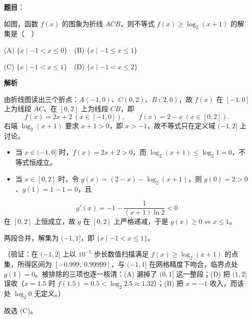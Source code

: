 \begin{answer}

\textbf{题目}：

如图，函数 \(f(x)\) 的图象为折线 \(ACB\)，则不等式 \(f(x)\geqslant\log_{2}(x+1)\) 的解集是（　）
\nopagebreak[4]
\begin{center}\end{center}
\nopagebreak[4]
(A) \(\{x\mid -1<x\leqslant 0\}\)　(B) \(\{x\mid -1\leqslant x\leqslant 1\}\)

(C) \(\{x\mid -1<x\leqslant 1\}\)　(D) \(\{x\mid -1<x\leqslant 2\}\)

\textbf{解析}

由折线图读出三个折点：\(A(-1,0)\)、\(C(0,2)\)、\(B(2,0)\)，故 \(f(x)\) 在 \([-1,0]\) 上为线段 \(AC\)、在 \([0,2]\) 上为线段 \(CB\)，即
\nopagebreak[4]
\[
f(x)=2x+2\ (x\in[-1,0]),\qquad f(x)=2-x\ (x\in[0,2]).
\]
右端 \(\log_{2}(x+1)\) 要求 \(x+1>0\)，即 \(x>-1\)，故不等式只在定义域 \((-1,2]\) 上讨论。

\begin{itemize}
\item 当 \(x\in(-1,0]\) 时，\(f(x)=2x+2>0\)，而 \(\log_{2}(x+1)\leqslant\log_{2}1=0\)，不等式恒成立。
\item 当 \(x\in[0,2]\) 时，令 \(g(x)=(2-x)-\log_{2}(x+1)\)，则 \(g(0)=2>0\)、\(g(1)=1-1=0\)，且
\end{itemize}
\nopagebreak[4]
\[
g'(x)=-1-\frac{1}{(x+1)\ln 2}<0
\]
在 \([0,2]\) 上恒成立，故 \(g\) 在 \([0,2]\) 上严格递减，于是 \(g(x)\geqslant0\iff x\leqslant1\)。

两段合并，解集为 \((-1,1]\)，即 \(\{x\mid -1<x\leqslant1\}\)。

（验证：在 \((-1,2]\) 上以 \(10^{-5}\) 步长数值扫描满足 \(f(x)\geqslant\log_{2}(x+1)\) 的点集，所得区间为 \([-0.999,\ 0.99999]\)，与 \((-1,1]\) 在网格精度下吻合，临界点处 \(g(1)=0\)。被排除的三项也逐一核清：(A) 漏掉了 \((0,1]\) 这一整段；(D) 把 \((1,2]\) 误收（\(x=1.5\) 时 \(f(1.5)=0.5<\log_{2}2.5\approx1.32\)）；(B) 把 \(x=-1\) 收入，而该处 \(\log_{2}0\) 无定义。）

故选 (C)。


\end{answer}
